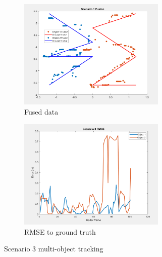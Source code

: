 \begin{figure}[!htb]
    \begin{subfigure}[b]{0.475\textwidth}%
        \includegraphics[width=7cm]{Figures/fusion_scene3.png}
        \caption{Fused data}
        \label{subfig:with_fusion_3}
    \end{subfigure}
    \begin{subfigure}[b]{0.475\textwidth}%
        \includegraphics[width=7cm]{Figures/RMSE3.png}
        \caption{RMSE to ground truth}
        \label{subfig:RMSE_3}
    \end{subfigure}
    \caption{Scenario 3 multi-object tracking}
    \label{fig:scenario_result_3}
\end{figure}
\newpage



